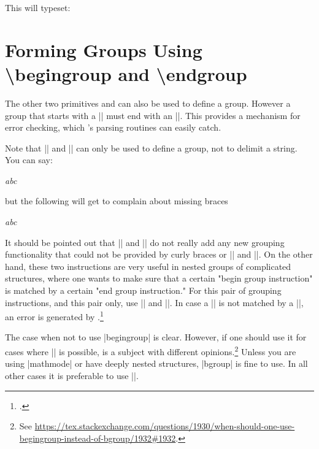This will typeset:

\def\beginindent{\bgroup\parindent=-20pt}
\def\endindent{\par\egroup}

\beginindent
  \small\lipsum[1-3]
\endindent

\section{Forming Groups Using \textbackslash begingroup and \textbackslash endgroup} 

The other two primitives  and  can also be used to define a group. However a group that starts with a |\begingroup| must end with an |\endgroup|. This provides a mechanism for error checking, which \tex's parsing routines can easily catch.

Note that |\begingroup| and |\endgroup| can only be used to define a group, not to delimit a string. You can say:

\begin{teX}
\begingroup
  \it abc
\endgroup
\end{teX}

but the following will get \tex to complain about missing braces

\begin{teX}
\hbox\begingroup\it abc\endgroup
\end{teX}

It should be pointed out that |\begingroup| and |\endgroup| do not really
add any new grouping functionality that could not be provided by curly braces
or |\bgroup| and |\egroup|. On the other hand, these two instructions are very
useful in nested groups of complicated structures, where one wants to make sure
that a certain "begin group instruction" is matched by a certain "end group
instruction." For this pair of grouping instructions, and this pair only, use |\begingroup|
and |\endgroup|. In case a |\begingroup| is not matched by a |\endgroup|,
an error is generated by \tex.\footcite{bechto1993} 

The case when not to use |begingroup| is clear. However, if one should use it for cases where
|\bgroup| is possible, is a subject with different opinions.\footnote{See \url{https://tex.stackexchange.com/questions/1930/when-should-one-use-begingroup-instead-of-bgroup/1932\#1932}.} Unless you are using |mathmode| or have deeply nested structures, |bgroup| is fine to use. In all
other cases it is preferable to use |\begingroup|.

